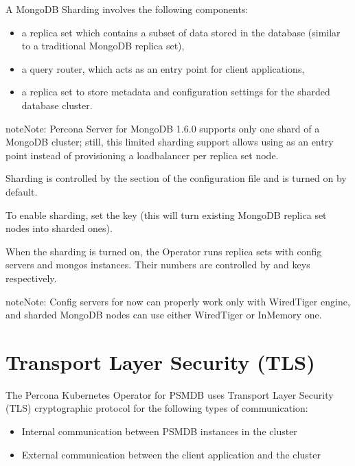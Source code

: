\documentclass[letterpaper,10pt,english]{sphinxmanual}
\begin{document}
A MongoDB Sharding involves the following components:
\begin{itemize}
\item {} 
 \sphinxhyphen{} a replica set which contains a subset of data stored in the
database (similar to a traditional MongoDB replica set),

\item {} 
 \sphinxhyphen{} a query router, which acts as an entry point for client applications,

\item {} 
 \sphinxhyphen{} a replica set to store metadata and configuration
settings for the sharded database cluster.

\end{itemize}

\begin{sphinxadmonition}{note}{Note:}
Percona Server for MongoDB 1.6.0 supports only one shard of a MongoDB
cluster; still, this limited sharding support allows using  as an
entry point instead of provisioning a load\sphinxhyphen{}balancer per replica set node.
\end{sphinxadmonition}

Sharding is controlled by the  section of the 
configuration file and is turned on by default.

To enable sharding, set the  key  (this will turn
existing MongoDB replica set nodes into sharded ones).

When the sharding is turned on, the Operator runs replica sets with config
servers and mongos instances. Their numbers are controlled by
 and  keys respectively.

\begin{sphinxadmonition}{note}{Note:}
Config servers for now can properly work only with WiredTiger engine,
and sharded MongoDB nodes can use either WiredTiger or InMemory one.
\end{sphinxadmonition}


\chapter{Transport Layer Security (TLS)}
\label{\detokenize{TLS:transport-layer-security-tls}}\label{\detokenize{TLS:tls}}\label{\detokenize{TLS::doc}}
The Percona Kubernetes Operator for PSMDB uses Transport Layer Security (TLS) cryptographic protocol for the following types of communication:
\begin{itemize}
\item {} 
Internal \sphinxhyphen{} communication between PSMDB instances in the cluster

\item {} 
External \sphinxhyphen{} communication between the client application and the cluster

\end{itemize}
\end{document}
